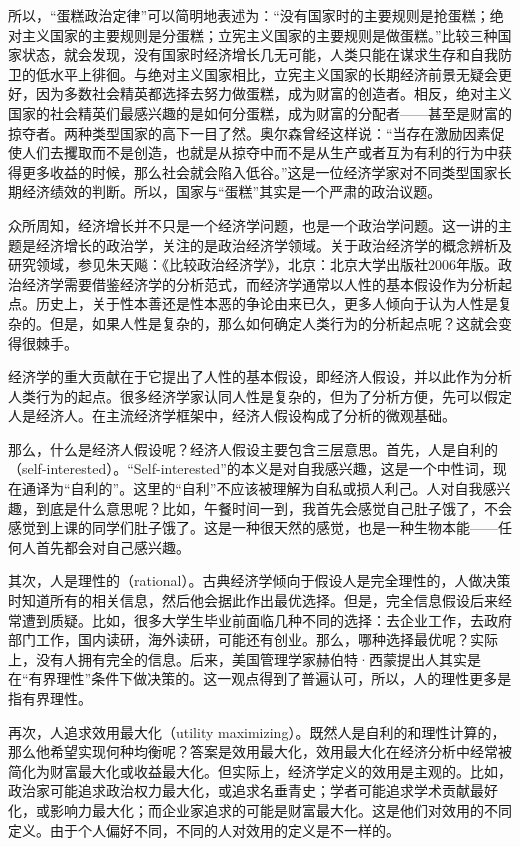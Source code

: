 所以，“蛋糕政治定律”可以简明地表述为：“没有国家时的主要规则是抢蛋糕；绝对主义国家的主要规则是分蛋糕；立宪主义国家的主要规则是做蛋糕。”比较三种国家状态，就会发现，没有国家时经济增长几无可能，人类只能在谋求生存和自我防卫的低水平上徘徊。与绝对主义国家相比，立宪主义国家的长期经济前景无疑会更好，因为多数社会精英都选择去努力做蛋糕，成为财富的创造者。相反，绝对主义国家的社会精英们最感兴趣的是如何分蛋糕，成为财富的分配者——甚至是财富的掠夺者。两种类型国家的高下一目了然。奥尔森曾经这样说：“当存在激励因素促使人们去攫取而不是创造，也就是从掠夺中而不是从生产或者互为有利的行为中获得更多收益的时候，那么社会就会陷入低谷。”这是一位经济学家对不同类型国家长期经济绩效的判断。所以，国家与“蛋糕”其实是一个严肃的政治议题。


众所周知，经济增长并不只是一个经济学问题，也是一个政治学问题。这一讲的主题是经济增长的政治学，关注的是政治经济学领域。关于政治经济学的概念辨析及研究领域，参见朱天飚：《比较政治经济学》，北京：北京大学出版社2006年版。政治经济学需要借鉴经济学的分析范式，而经济学通常以人性的基本假设作为分析起点。历史上，关于性本善还是性本恶的争论由来已久，更多人倾向于认为人性是复杂的。但是，如果人性是复杂的，那么如何确定人类行为的分析起点呢？这就会变得很棘手。

经济学的重大贡献在于它提出了人性的基本假设，即经济人假设，并以此作为分析人类行为的起点。很多经济学家认同人性是复杂的，但为了分析方便，先可以假定人是经济人。在主流经济学框架中，经济人假设构成了分析的微观基础。

那么，什么是经济人假设呢？经济人假设主要包含三层意思。首先，人是自利的（self-interested）。“Self-interested”的本义是对自我感兴趣，这是一个中性词，现在通译为“自利的”。这里的“自利”不应该被理解为自私或损人利己。人对自我感兴趣，到底是什么意思呢？比如，午餐时间一到，我首先会感觉自己肚子饿了，不会感觉到上课的同学们肚子饿了。这是一种很天然的感觉，也是一种生物本能——任何人首先都会对自己感兴趣。

其次，人是理性的（rational）。古典经济学倾向于假设人是完全理性的，人做决策时知道所有的相关信息，然后他会据此作出最优选择。但是，完全信息假设后来经常遭到质疑。比如，很多大学生毕业前面临几种不同的选择：去企业工作，去政府部门工作，国内读研，海外读研，可能还有创业。那么，哪种选择最优呢？实际上，没有人拥有完全的信息。后来，美国管理学家赫伯特·西蒙提出人其实是在“有界理性”条件下做决策的。这一观点得到了普遍认可，所以，人的理性更多是指有界理性。

再次，人追求效用最大化（utility maximizing）。既然人是自利的和理性计算的，那么他希望实现何种均衡呢？答案是效用最大化，效用最大化在经济分析中经常被简化为财富最大化或收益最大化。但实际上，经济学定义的效用是主观的。比如，政治家可能追求政治权力最大化，或追求名垂青史；学者可能追求学术贡献最好化，或影响力最大化；而企业家追求的可能是财富最大化。这是他们对效用的不同定义。由于个人偏好不同，不同的人对效用的定义是不一样的。

